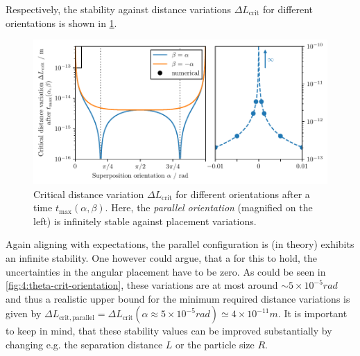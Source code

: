 Respectively, the stability against distance variations $\Delta L_\mathrm{crit}$ for different orientations is shown in \cref{fig:4:L-crit-orientation}.
\begin{figure}[!htbp]
  \centering
  \includegraphics[width=\textwidth]{./../figures/L-variance/L-crit-orientation-complete.pdf}
  \caption{Critical distance variation $\Delta L_\mathrm{crit}$ for different orientations after a time $t_\mathrm{max}(\alpha,\beta)$. Here, the \emph{parallel orientation} (magnified on the left) is infinitely stable against placement variations.}
  \label{fig:4:L-crit-orientation}
\end{figure}
Again aligning with expectations, the parallel configuration is (in theory) exhibits an infinite stability.
One however could argue, that a for this to hold, the uncertainties in the angular placement have to be zero. As could be seen in \cref{fig:4:theta-crit-orientation}, these variations are at most around $\sim 5 \times 10^{-5}\si{rad}$ and thus a realistic upper bound for the minimum required distance variations is given by $\Delta L_\mathrm{crit,parallel} = \Delta L_\mathrm{crit}(\alpha \approx 5\times 10^{-5}\si{rad}) \simeq 4\times 10^{-11}\si{m}$.
It is important to keep in mind, that these stability values can be improved substantially by changing e.g. the separation distance $L$ or the particle size $R$.

